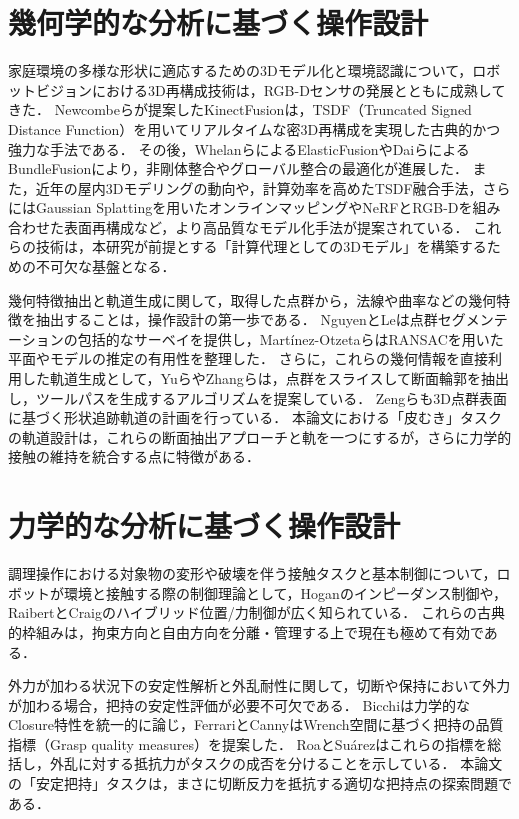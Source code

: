 \section{幾何学的な分析に基づく操作設計}
家庭環境の多様な形状に適応するための3Dモデル化と環境認識について，ロボットビジョンにおける3D再構成技術は，RGB-Dセンサの発展とともに成熟してきた．
Newcombeら\cite{Newcombe2011KinectFusion}が提案したKinectFusionは，TSDF（Truncated Signed Distance Function）を用いてリアルタイムな密3D再構成を実現した古典的かつ強力な手法である．
その後，Whelanら\cite{Whelan2015ElasticFusion}によるElasticFusionやDaiら\cite{Dai2017BundleFusion}によるBundleFusionにより，非剛体整合やグローバル整合の最適化が進展した．
また，近年の屋内3Dモデリングの動向\cite{Yuan2021RGBDIndoorSurvey}や，計算効率を高めたTSDF融合手法\cite{Li2024RGBTSDF}，さらにはGaussian Splattingを用いたオンラインマッピング\cite{GSFusion2024}やNeRFとRGB-Dを組み合わせた表面再構成\cite{Lee2024InFusionSurf}など，より高品質なモデル化手法が提案されている．
これらの技術は，本研究が前提とする「計算代理としての3Dモデル」を構築するための不可欠な基盤となる．

幾何特徴抽出と軌道生成に関して，取得した点群から，法線や曲率などの幾何特徴を抽出することは，操作設計の第一歩である．
NguyenとLe\cite{Nguyen2013PointCloudSegSurvey}は点群セグメンテーションの包括的なサーベイを提供し，Martínez-Otzetaら\cite{MartinezOtzeta2022RANSACSurvey}はRANSACを用いた平面やモデルの推定の有用性を整理した．
さらに，これらの幾何情報を直接利用した軌道生成として，Yuら\cite{Yu2021PointCloudSlicingRobotica}やZhangら\cite{Zhang2025ContourParallelToolpathPointCloud}は，点群をスライスして断面輪郭を抽出し，ツールパスを生成するアルゴリズムを提案している．
Zengら\cite{Zeng2024ShapeFollowingLaserCleaning}も3D点群表面に基づく形状追跡軌道の計画を行っている．
本論文における「皮むき」タスクの軌道設計は，これらの断面抽出アプローチと軌を一つにするが，さらに力学的接触の維持を統合する点に特徴がある．

\section{力学的な分析に基づく操作設計}
調理操作における対象物の変形や破壊を伴う接触タスクと基本制御について，ロボットが環境と接触する際の制御理論として，Hogan\cite{Hogan1985ImpedanceControl}のインピーダンス制御や，RaibertとCraig\cite{RaibertCraig1981Hybrid}のハイブリッド位置/力制御が広く知られている．
これらの古典的枠組みは，拘束方向と自由方向を分離・管理する上で現在も極めて有効である．

外力が加わる状況下の安定性解析と外乱耐性に関して，切断や保持において外力が加わる場合，把持の安定性評価が必要不可欠である．
Bicchi\cite{Bicchi1995Closure}は力学的なClosure特性を統一的に論じ，FerrariとCanny\cite{FerrariCanny1992OptimalGrasps}はWrench空間に基づく把持の品質指標（Grasp quality measures）を提案した．
RoaとSuárez\cite{RoaSuarez2014GraspQualityReview}はこれらの指標を総括し，外乱に対する抵抗力がタスクの成否を分けることを示している．
本論文の「安定把持」タスクは，まさに切断反力を抵抗する適切な把持点の探索問題である．


